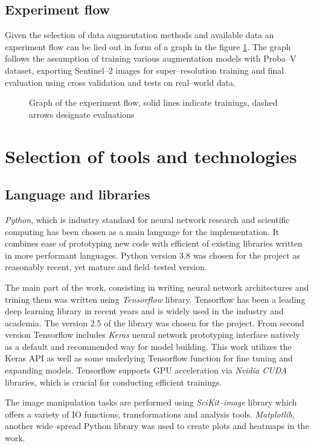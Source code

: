 \subsection{Experiment flow}
Given the selection of data augmentation methods and available data an experiment flow can be lied out in form of a graph in the figure \ref{fig:experiment-flow}.
The graph follows the assumption of training various augmentation models with Proba--V dataset, exporting Sentinel--2 images for super--resolution training and final evaluation using cross validation and tests on real--world data.
\begin{figure}
	\centering
	
	\caption{Graph of the experiment flow, solid lines indicate trainings, dashed arrows designate evaluations}
	\label{fig:experiment-flow}
\end{figure}

\section{Selection of tools and technologies}
\subsection{Language and libraries}
\textit{Python}, which is industry standard for neural network research and scientific computing has been chosen as a main language for the implementation.
It combines ease of prototyping new code with efficient of existing libraries written in more performant languages.
Python version 3.8 was chosen for the project as reasonably recent, yet mature and field--tested version.

The main part of the work, consisting in writing neural network architectures and trining them was written using \textit{Tensorflow} library.
Tensorflow has been a leading deep learning library in recent years and is widely used in the industry and academia.
The version 2.5 of the library was chosen for the project.
From second version Tensorflow includes \textit{Keras} neural network prototyping interface natively as a default and recommended way for model building.
This work utilizes the Keras API as well as some underlying Tensorflow function for fine tuning and expanding models.
Tensorflow supports GPU acceleration via \textit{Nvidia CUDA} libraries, which is crucial for conducting efficient trainings.

The image manipulation tasks are performed using \textit{SciKit--image} library which offers a variety of IO functions, transformations and analysis tools.
\textit{Matplotlib}, another wide--spread Python library was used to create plots and heatmaps in the work.

